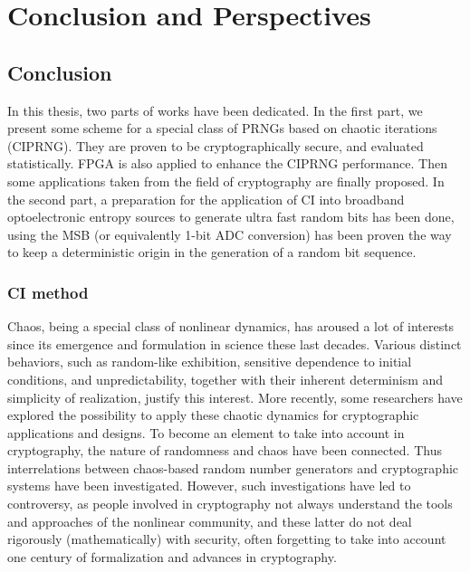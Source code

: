 \part{Conclusion and Perspectives}
\label{end con}
\chapter{Conclusion}
In this thesis, two parts of works have been dedicated. In the first part, we present some scheme for a special class of PRNGs based on chaotic iterations (CIPRNG). They are proven to be cryptographically secure, and evaluated statistically. FPGA is also applied to enhance the CIPRNG performance. Then some applications taken from the field of cryptography are finally proposed. In the second part, a preparation for the application of CI into broadband optoelectronic entropy sources to generate ultra fast random bits has been done, using the MSB (or equivalently 1-bit ADC conversion) has been proven the way to keep a deterministic origin in the generation of a random bit sequence. 

\section{CI method}
Chaos, being a special class of nonlinear dynamics, has aroused a lot of interests since its emergence and formulation in science these last decades. Various distinct  behaviors, such as random-like exhibition, sensitive dependence to initial conditions, and unpredictability, together with their inherent determinism and simplicity of realization, justify this interest. More recently, some researchers have explored the possibility to apply these chaotic dynamics for cryptographic applications and designs. To become an element to take into account in cryptography, the nature of randomness and chaos have been connected. Thus interrelations between chaos-based random number generators and cryptographic systems have been investigated. However, such investigations have led to controversy, as people involved in cryptography not always understand the tools and approaches of the nonlinear community, and these latter do not deal rigorously (mathematically) with security, often forgetting to take into account one century of formalization and advances in cryptography.

